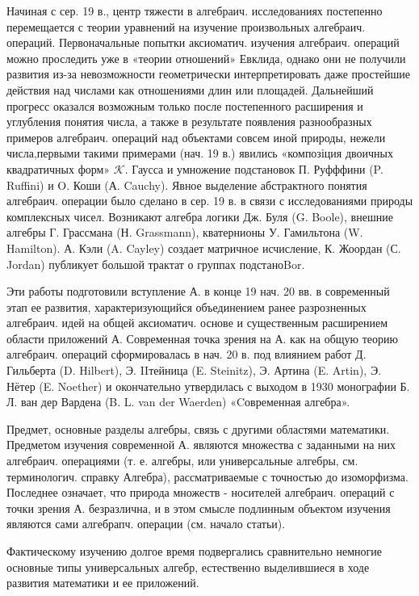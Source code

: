 \documentclass[10pt]{article}
\begin{document}
Начиная с сер. 19 в., центр тяжести в алгебраич. исследованиях постепенно перемещается с теории уравнений на изучение произвольных алгебраич. операций. Первоначальные попытки аксиоматич. изучения алгебраич. операций можно проследить уже в «теории отношений» Евклида, однако они не получили развития из-за невозможности геометрически интерпретировать даже простейшие действия над числами как отношениями длин или площадей. Дальнейший прогресс оказался возможным только после постепенного расширения и углубления понятия числа, а также в результате появления разнообразных примеров алгебраич. операций над объектами совсем иной природы, нежели числа,первыми такими примерами (нач. 19 в.) явились «композіция двоичных квадратичных форм» $\mathcal{K}$. Гаусса и умножение подстановок П. Руфффини (P. Ruffini) и O. Коши (А. Cauchy). Явное выделение абстрактного понятия алгебраич. операции было сделано в сер. 19 в. в связи с исследованиями природы комплексных чисел. Возникают алгебра логики Дж. Буля (G. Boole), внешние алгебры Г. Грассмана (Н. Grassmann), кватернионы У. Гамильтона (W. Hamilton). А. Кэли (A. Cayley) создает матричное исчисление, К. Жоордан (С. Jordan) публикует большой трактат о группах подстаноBor.



Эти работы подготовили вступление А. в конце 19 нач. 20 вв. в современный этап ее развития, характеризующийся объединением ранее разрозненных алгебраич. идей на общей аксиоматич. основе и существенным расширением области приложений А. Современная точка зрения на А. как на общую теорию алгебраич. операций сформировалась в нач. 20 в. под влиянием работ Д. Гильберта (D. Hilbert), Э. IIтейница (E. Steinitz), Э. Артина (E. Artin), Э. Нётер (E. Noether) и окончательно утвердилась с выходом в 1930 монографии Б. Л. ван дер Вардена (B. L. van der Waerden) «Cовременная алгебра».



Предмет, основные разделы алгебры, связь с другими областями математики. Предметом изучения современной А. являются множества с заданными на них алгебраич. операциями (т. е. алгебры, или универсальные алгебры, см. терминологич. справку Алгебра), рассматриваемые с точностью до изоморфизма. Последнее означает, что природа множеств - носителей алгебраич. операций с точки зрения А. безразлична, и в этом смысле подлинным объектом изучения являются сами алгебрапч. операции (см. начало статьи).



Фактическому изучению долгое время подвергались сравнительно немногие основные типы универсальных алгебр, естественно выделившиеся в ходе развития математики и ее приложений.
\end{document}
